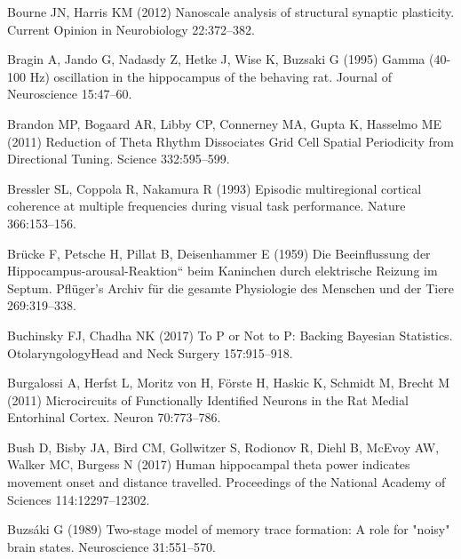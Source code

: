 \documentclass[
  12pt,
  a4paper,
  openany]{book}
\newlength{\cslhangindent}
\newlength{\cslentryspacingunit} %
\newenvironment{CSLReferences}[2] %
 {%
  \setlength{\parindent}{0pt}
  \ifodd #1
  \let\oldpar\par
  \def\par{\hangindent=\cslhangindent\oldpar}
  \fi
  \setlength{\parskip}{#2\cslentryspacingunit}
 }%
 {}
\begin{document}
\begin{CSLReferences}{1}{0}
\leavevmode{}%
Bourne JN, Harris KM (2012) Nanoscale analysis of structural synaptic plasticity. Current Opinion in Neurobiology 22:372--382.

\leavevmode{}%
Bragin A, Jando G, Nadasdy Z, Hetke J, Wise K, Buzsaki G (1995) Gamma (40-100 {Hz}) oscillation in the hippocampus of the behaving rat. Journal of Neuroscience 15:47--60.

\leavevmode{}%
Brandon MP, Bogaard AR, Libby CP, Connerney MA, Gupta K, Hasselmo ME (2011) Reduction of {Theta} {Rhythm} {Dissociates} {Grid} {Cell} {Spatial} {Periodicity} from {Directional} {Tuning}. Science 332:595--599.

\leavevmode{}%
Bressler SL, Coppola R, Nakamura R (1993) Episodic multiregional cortical coherence at multiple frequencies during visual task performance. Nature 366:153--156.

\leavevmode{}%
Brücke F, Petsche H, Pillat B, Deisenhammer E (1959) Die {Beeinflussung} der {\quotedblbase}{Hippocampus}-arousal-{Reaktion}{``} beim {Kaninchen} durch elektrische {Reizung} im {Septum}. Pfl{ü}ger's Archiv f{ü}r die gesamte Physiologie des Menschen und der Tiere 269:319--338.

\leavevmode{}%
Buchinsky FJ, Chadha NK (2017) To {P} or {Not} to {P}: {Backing} {Bayesian} {Statistics}. Otolaryngology{\textendash}Head and Neck Surgery 157:915--918.

\leavevmode{}%
Burgalossi A, Herfst L, Moritz von H, Förste H, Haskic K, Schmidt M, Brecht M (2011) Microcircuits of {Functionally} {Identified} {Neurons} in the {Rat} {Medial} {Entorhinal} {Cortex}. Neuron 70:773--786.

\leavevmode{}%
Bush D, Bisby JA, Bird CM, Gollwitzer S, Rodionov R, Diehl B, McEvoy AW, Walker MC, Burgess N (2017) Human hippocampal theta power indicates movement onset and distance travelled. Proceedings of the National Academy of Sciences 114:12297--12302.

\leavevmode{}%
Buzsáki G (1989) Two-stage model of memory trace formation: A role for "noisy" brain states. Neuroscience 31:551--570.


\end{CSLReferences}
\end{document}

